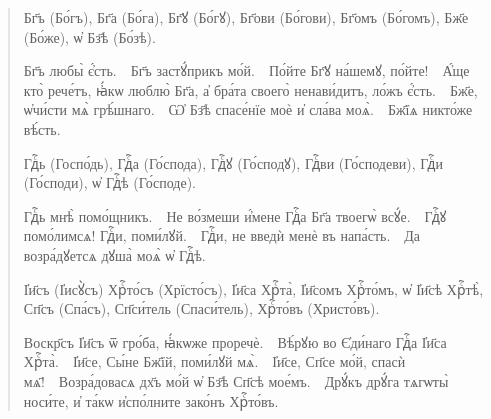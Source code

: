 \documentclass[11pt,a4paper,oneside]{memoir}
\newcommand{\exercise}{}
\begin{document}
    \begin{quote}\begin{slv}
        Бг҃ъ (Бо́гъ), Бг҃а (Бо́га), Бг҃ꙋ (Бо́гꙋ), Бг҃ови (Бо́гови), Бг҃омъ (Бо́гомъ), Бж҃е (Бо́же), ѡ҆ Бз҃ѣ (Бо́зѣ).
        
        Бг҃ъ любы̀ є҆́сть.~\textemdash~Бг҃ъ застꙋ́прикъ мо́й.~\textemdash~По́йте Бг҃ꙋ на́шемꙋ, по́йте!~\textemdash~А҆́ще кто̀ рече́тъ, ꙗ҆́кѡ люблю̀ Бг҃а, а҆ бра́та своего̀ ненави́дитъ, ло́жъ є҆́сть.~\textemdash~Бж҃е, ѡ҆чи́сти мѧ̀ грѣ́шнаго.~\textemdash~Ѡ҆ Бз҃ѣ спасе́нїе моѐ и҆ сла́ва моѧ̀.~\textemdash~Бж҃їѧ никто́же вѣ́сть.
        
        Гдⷭ҇ь (Госпо́дь), Гдⷭ҇а (Го́спода), Гдⷭ҇ꙋ (Го́сподꙋ), Гдⷭ҇ви (Го́сподеви), Гдⷭ҇и (Го́споди), ѡ҆ Гдⷭ҇ѣ (Го́споде).
        
        Гдⷭ҇ь мнѣ̀ помо́щникъ.~\textemdash~Не во́змеши и҆́мене Гдⷭ҇а Бг҃а твоегѡ̀ всꙋ́е.~\textemdash~Гдⷭ҇ꙋ помо́лимсѧ! Гдⷭ҇и, поми́лꙋй.~\textemdash~Гдⷭ҇и, не введѝ менѐ въ напа́сть.~\textemdash~Да возра́дꙋетсѧ дꙋша̀ моѧ̀ ѡ҆ Гдⷭ҇ѣ.
        
        І҆и҃съ (І҆исꙋ̀съ) Хрⷭ҇то́съ (Хрїсто́съ), І҆и҃са Хрⷭ҇та̀, І҆и҃сомъ Хрⷭ҇то́мъ, ѡ҆ І҆и҃сѣ Хрⷭ҇тѣ̀, Сп҃съ (Спа́съ), Сп҃си́тель (Спаси́тель), Хрⷭ҇то́въ (Христо́въ).
        
        Воскр҃съ І҆и҃съ ѿ гро́ба, ꙗ҆́кѡже проречѐ.~\textemdash~Вѣ́рꙋю во Є҆ди́наго Гдⷭ҇а І҆и҃са Хрⷭ҇та̀.~\textemdash~І҆и҃се, Сы́не Бж҃їй, поми́лꙋй мѧ̀.~\textemdash~І҆и҃се, Сп҃се мо́й, спасѝ мѧ҃!~\textemdash~Возра́довасѧ дх҃ъ мо́й ѡ҆ Бз҃ѣ Сп҃сѣ мое́мъ.~\textemdash~Дрꙋ́къ дрꙋ́га тѧгѡты̀ носи́те, и҆ та́кѡ и҆спо́лните зако́нъ Хрⷭ҇то́въ.
    \end{slv}\end{quote}

                    \paragraph{\exercise}
    
\end{document}
